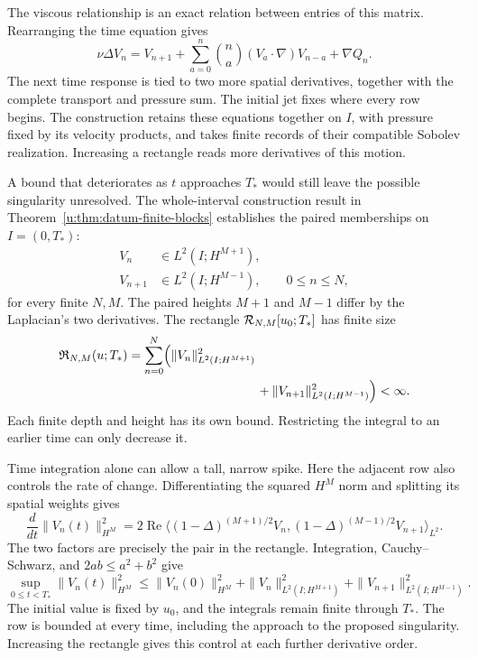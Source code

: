 The viscous relationship is an exact relation between entries of this
matrix. Rearranging the time equation gives
\[
 \nu\Delta V_n=V_{n+1}
 +\sum_{a=0}^{n}\binom na(V_a\cdot\nabla)V_{n-a}
 +\nabla Q_n.
\]
The next time response is tied to two more spatial derivatives, together
with the complete transport and pressure sum. The initial jet fixes where
every row begins. The construction retains these equations together on
\(I\), with pressure fixed by its velocity products, and takes finite
records of their compatible Sobolev realization. Increasing a rectangle
reads more derivatives of this motion.

A bound that deteriorates as \(t\) approaches \(T_*\) would still
leave the possible singularity unresolved. The whole-interval construction
result in Theorem~\ref{u:thm:datum-finite-blocks} establishes the paired
memberships on \(I=(0,T_*)\):
\[
 \begin{aligned}
 V_n&\in L^2(I;H^{M+1}),\\
 V_{n+1}&\in L^2(I;H^{M-1}),
 \qquad 0\le n\le N,
 \end{aligned}
\]
for every finite \(N,M\). The paired heights \(M+1\) and \(M-1\)
differ by the Laplacian's two derivatives. The rectangle
\(\mathcal R_{N,M}[u_0;T_*]\) has finite size
\[
 \begin{aligned}
 \mathfrak R_{N,M}(u;T_*)
 &=\sum_{n=0}^{N}\Bigl(
   \|V_n\|_{L^2(I;H^{M+1})}^2\\
 &\hspace{36mm}+\|V_{n+1}\|_{L^2(I;H^{M-1})}^2\Bigr)<\infty.
 \end{aligned}
\]
Each finite depth and height has its own bound. Restricting the integral
to an earlier time can only decrease it.

Time integration alone can allow a tall, narrow spike. Here the adjacent
row also controls the rate of change. Differentiating the squared
\(H^M\) norm and splitting its spatial weights gives
\[
 \frac{d}{dt}\|V_n(t)\|_{H^M}^2
 =2\operatorname{Re}\langle
 (1-\Delta)^{(M+1)/2}V_n,
 (1-\Delta)^{(M-1)/2}V_{n+1}\rangle_{L^2}.
\]
The two factors are precisely the pair in the rectangle. Integration,
Cauchy--Schwarz, and \(2ab\le a^2+b^2\) give
\[
 \sup_{0\le t<T_*}\|V_n(t)\|_{H^M}^2
 \le\|V_n(0)\|_{H^M}^2
 +\|V_n\|_{L^2(I;H^{M+1})}^2
 +\|V_{n+1}\|_{L^2(I;H^{M-1})}^2.
\]
The initial value is fixed by \(u_0\), and the integrals remain finite
through \(T_*\). The row is bounded at every time, including the approach
to the proposed singularity. Increasing the rectangle gives this control
at each further derivative order.

